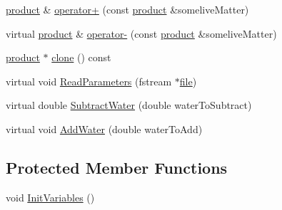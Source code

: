 \begin{DoxyCompactItemize}
\item 
\hyperlink{classproduct}{product} \& \hyperlink{classlive_matter_ae7a333e94f166a448a4b8f8b70ebe9fe}{operator+} (const \hyperlink{classproduct}{product} \&someliveMatter)
\item 
virtual \hyperlink{classproduct}{product} \& \hyperlink{classlive_matter_a6b8311a516ba78a7caacc80a28ec143e}{operator-\/} (const \hyperlink{classproduct}{product} \&someliveMatter)
\item 
\hyperlink{classproduct}{product} $\ast$ \hyperlink{classlive_matter_a08101ef64ee3eeec55d222bb75975370}{clone} () const 
\item 
virtual void \hyperlink{classlive_matter_acaf1db5a1bb2fc9beb79002771f0282c}{ReadParameters} (fstream $\ast$\hyperlink{classbase_a3af52ee9891719d09b8b19b42450b6f6}{file})
\item 
virtual double \hyperlink{classlive_matter_ac03a44e7ff2177c9ab7dc63876b0a6fc}{SubtractWater} (double waterToSubtract)
\item 
virtual void \hyperlink{classlive_matter_af84f48b8ee8f67cea63b35d033cefe3b}{AddWater} (double waterToAdd)
\end{DoxyCompactItemize}
\subsection*{Protected Member Functions}
\begin{DoxyCompactItemize}
\item 
void \hyperlink{classlive_matter_ab14efacc07e048507a6c3dd8d2942101}{InitVariables} ()
\end{DoxyCompactItemize}
